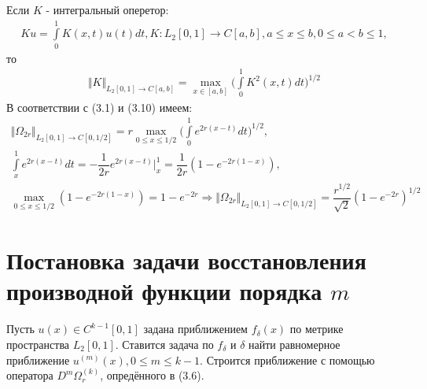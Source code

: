 Если $ K $ - интегральный оперетор:
\begin{equation}
\begin{array}{c}
\nonumber

Ku = \int\limits_0^1 K(x,t)u(t)dt, K:L_2[0,1] \rightarrow C[a,b], a \leq x \leq b, 0 \leq a < b \leq 1,

\end{array}
\end{equation}
то
\begin{equation}
\begin{array}{c}

\Vert K \Vert_{L_2[0,1] \rightarrow C[a,b]} = \max\limits_{x \in [a,b]}\biggl(\int\limits_0^1 K^2(x,t)dt\biggr)^{1/2}

\end{array}
\end{equation}
В соответствии с (3.1) и (3.10) имеем:
\begin{equation}
\begin{array}{c}
\nonumber

\Vert \Omega_{2r} \Vert_{L_2[0,1] \rightarrow C[0,1/2]} = r \max\limits_{0 \leq x \leq 1/2} \biggl(\int\limits_0^1 e^{2r(x-t)}dt\biggr)^{1/2}, \\
\int\limits_x^1 e^{2r(x-t)}dt = -\dfrac{1}{2r}e^{2r(x-t)}\biggl|_x^1 = \dfrac{1}{2r}(1-e^{-2r(1-x)}), \\
\max\limits_{0 \leq x \leq 1/2}(1-e^{-2r(1-x)}) = 1 - e^{-2r} \Rightarrow \Vert \Omega_{2r} \Vert_{L_2[0,1] \rightarrow C[0,1/2]} = \dfrac{r^{1/2}}{\sqrt{2}}( 1 - e^{-2r})^{1/2}

\end{array}
\end{equation}
\section{Постановка задачи восстановления производной функции порядка $ m $}
Пусть $ u(x) \in C^{k-1}[0,1] $ задана приближением $ f_\delta(x) $ по метрике пространства $ L_2[0,1] $.
Ставится задача по $ f_\delta $ и $ \delta $ найти равномерное приближение $ u^{(m)}(x), 0 \leq m \leq k-1 $.
Строится приближение с помощью оператора $ D^m\Omega_r^{(k)} $, опредённого в (3.6).

